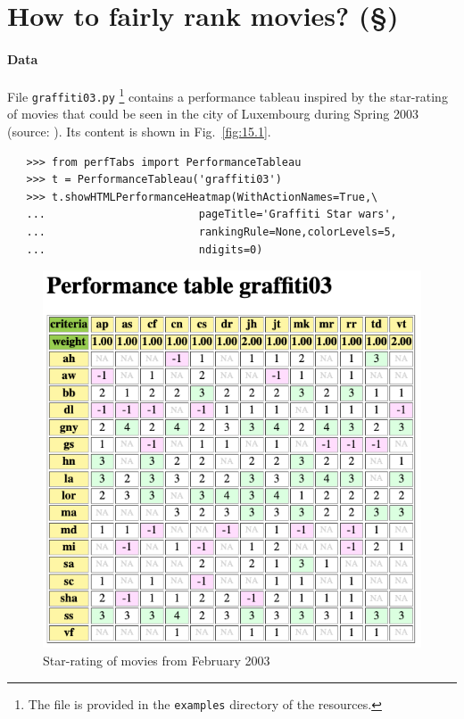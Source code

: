 \section{How to fairly rank movies? (§)}
\label{sec:15.2}

\paragraph{\textbf{Data}}

File \texttt{graffiti03.py} \footnote{The file is provided in the \texttt{examples} directory of the \Digraph resources.} contains a performance tableau inspired by the star-rating of movies that could be seen in the city of Luxembourg during Spring 2003 (source: \citealp{GRA-2003}). Its content is shown in Fig.~\vref{fig:15.1}.
\begin{lstlisting}
   >>> from perfTabs import PerformanceTableau
   >>> t = PerformanceTableau('graffiti03')
   >>> t.showHTMLPerformanceHeatmap(WithActionNames=True,\
   ...                        pageTitle='Graffiti Star wars',
   ...                        rankingRule=None,colorLevels=5,
   ...                        ndigits=0)   
\end{lstlisting}
\begin{figure}[ht]
\includegraphics[width=0.9\hsize]{Figures/15-1-moviesRatingData.png}
\caption{Star-rating of movies from February 2003}
\label{fig:15.1}       %
\end{figure}

